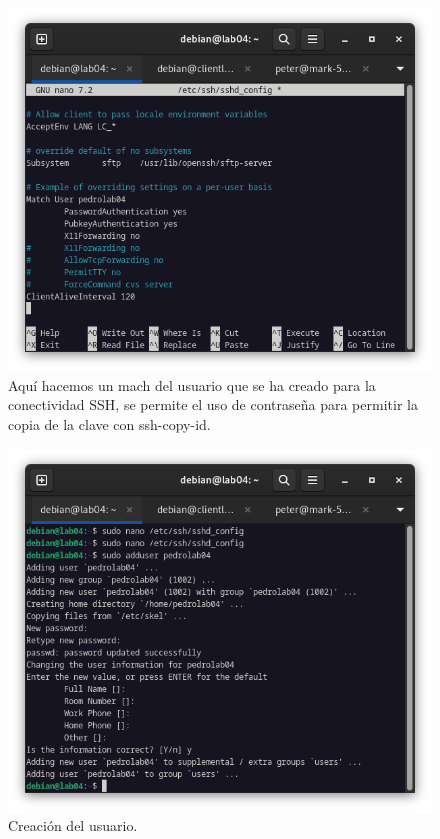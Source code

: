 \begin{figure}[H]
	\centering
	\includegraphics[scale=0.40]{03}
	\caption{Aquí hacemos un mach del usuario que se ha creado para la conectividad SSH, se permite el uso de contraseña para permitir la copia de la clave con ssh-copy-id.}
\end{figure}

\begin{figure}[H]
	\centering
	\includegraphics[scale=0.40]{04}
	\caption{Creación del usuario.}
\end{figure}

